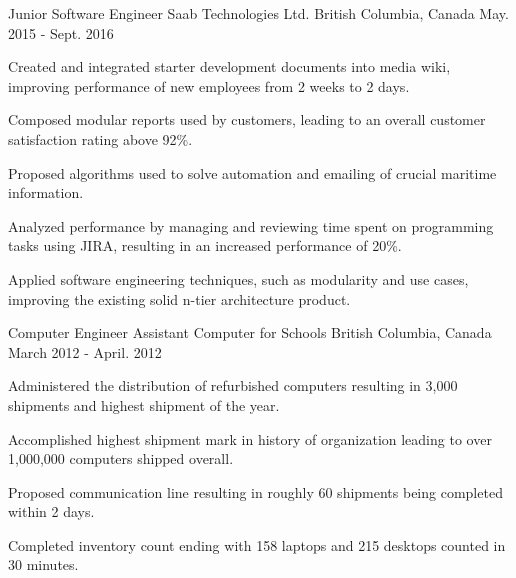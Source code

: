 

\begin{cventries}

  \cventry
    {Junior Software Engineer} %
    {Saab Technologies Ltd.} %
    {British Columbia, Canada} %
    {May. 2015 - Sept. 2016} %
    {
      \begin{cvitems} %
        \item {Created and integrated starter development documents into media wiki, improving performance of new employees from 2 weeks to 2 days.}
        \item {Composed modular reports used by customers, leading to an overall customer satisfaction rating above 92\%.}
        \item {Proposed algorithms used to solve automation and emailing of crucial maritime information.}
        \item {Analyzed performance by managing and reviewing time spent on programming tasks using JIRA, resulting in an increased performance of 20\%.}
        \item {Applied  software engineering techniques, such as modularity and use cases, improving the existing solid n-tier architecture product.}
      \end{cvitems}
    }

  \cventry
    {Computer Engineer Assistant} %
    {Computer for Schools} %
    {British Columbia, Canada} %
    {March 2012 - April. 2012} %
    {
      \begin{cvitems} %
        \item {Administered the distribution of refurbished computers resulting in 3,000 shipments and highest shipment of the year.}
        \item {Accomplished highest shipment mark in history of organization leading to over 1,000,000 computers shipped overall.}
        \item {Proposed communication line resulting in roughly 60 shipments being completed within 2 days.}
        \item {Completed inventory count ending with 158 laptops and 215 desktops counted in 30 minutes.}
      \end{cvitems}
    }
\end{cventries}
